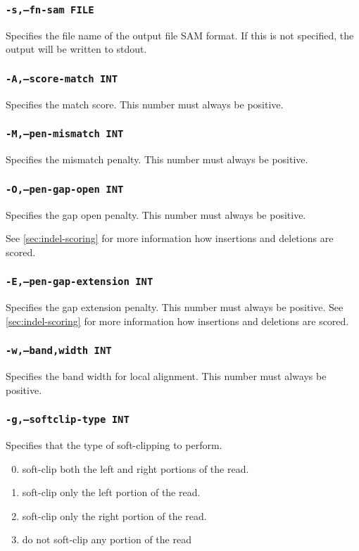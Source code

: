 \documentclass[a4paper,12pt]{book}
\newcommand{\TT}[1]{{\tt #1}} %
\begin{document}
\subsubsection{\TT{-s,--fn-sam FILE}}
Specifies the file name of the output file SAM format.
If this is not specified, the output will be written to stdout.

\subsubsection{\TT{-A,--score-match INT}}
Specifies the match score.
This number must always be positive.

\subsubsection{\TT{-M,--pen-mismatch INT}}
Specifies the mismatch penalty.
This number must always be positive.

\subsubsection{\TT{-O,--pen-gap-open INT}}
Specifies the gap open penalty.
This number must always be positive.

See \autoref{sec:indel-scoring} for more information how insertions and deletions are scored.
\subsubsection{\TT{-E,--pen-gap-extension INT}}
Specifies the gap extension penalty.
This number must always be positive.
See \autoref{sec:indel-scoring} for more information how insertions and deletions are scored.

\subsubsection{\TT{-w,--band,width INT}}
Specifies the band width for local alignment.
This number must always be positive.

\subsubsection{\TT{-g,--softclip-type INT}}
Specifies that the type of soft-clipping to perform.
\begin{enumerate}
	\setcounter{enumi}{-1} %
	\item soft-clip both the left and right portions of the read.
	\item soft-clip only the left portion of the read.
	\item soft-clip only the right portion of the read.
	\item do not soft-clip any portion of the read
\end{enumerate}
\end{document}
